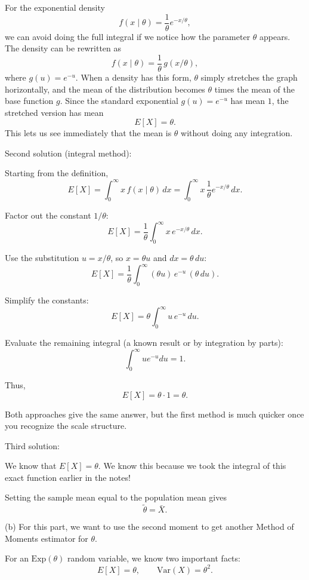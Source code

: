 \documentclass[11pt,letterpaper]{article}
\theoremstyle{remark}
\begin{document}
For the exponential density
\[
f(x\mid\theta)=\frac{1}{\theta}e^{-x/\theta},
\]
we can avoid doing the full integral if we notice how the parameter $\theta$ appears.
The density can be rewritten as
\[
f(x\mid\theta)=\frac{1}{\theta}\, g(x/\theta),
\]
where $g(u)=e^{-u}$.
When a density has this form, $\theta$ simply stretches the graph horizontally, and the mean of the distribution becomes $\theta$ times the mean of the base function $g$.
Since the standard exponential $g(u)=e^{-u}$ has mean $1$, the stretched version has mean
\[
E[X]=\theta.
\]
This lets us see immediately that the mean is $\theta$ without doing any integration.

\vspace{0.5cm}

Second solution (integral method):

Starting from the definition,
\[
E[X] = \int_0^\infty x\, f(x\mid\theta)\, dx
       = \int_0^\infty x\, \frac{1}{\theta} e^{-x/\theta}\, dx.
\]

Factor out the constant $1/\theta$:
\[
E[X] = \frac{1}{\theta} \int_0^\infty x\, e^{-x/\theta}\, dx.
\]

Use the substitution $u = x/\theta$, so $x=\theta u$ and $dx=\theta\,du$:
\[
E[X] = \frac{1}{\theta} \int_0^\infty (\theta u)\, e^{-u}\, (\theta\,du).
\]

Simplify the constants:
\[
E[X] = \theta \int_0^\infty u\, e^{-u}\, du.
\]

Evaluate the remaining integral (a known result or by integration by parts):
\[
\int_0^\infty u e^{-u} du = 1.
\]

Thus,
\[
E[X] = \theta \cdot 1 = \theta.
\]

Both approaches give the same answer, but the first method is much quicker once you recognize the scale structure.

\vspace{0.5cm}

Third solution:

We know that $E[X] = \theta$. We know this because we took the integral of this exact function earlier in the notes!

Setting the sample mean equal to the population mean gives
\[
\boxed{\tilde{\theta} = \bar{X}.}
\]

(b) For this part, we want to use the second moment to get another
Method of Moments estimator for $\theta$.

For an $\mathrm{Exp}(\theta)$ random variable, we know two important facts:
\[
E[X] = \theta,
\qquad
\mathrm{Var}(X) = \theta^{2}.
\]
\end{document}
